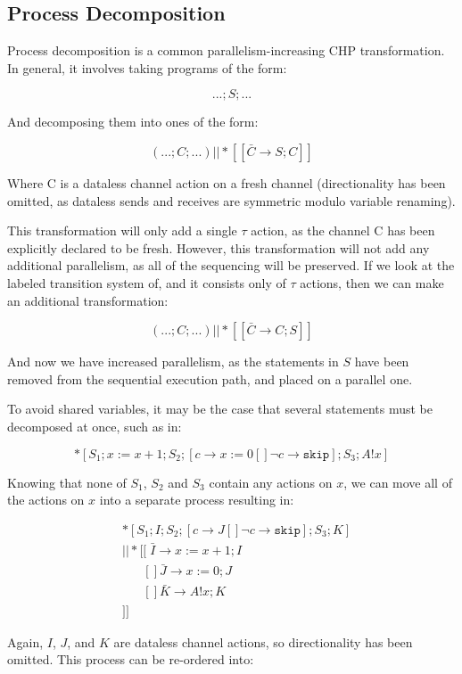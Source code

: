 \documentclass[times, 10pt]{article}
\begin{document}
\subsection{Process Decomposition}

Process decomposition is a common parallelism-increasing CHP transformation.  In
general, it involves taking programs of the form:

\[
...;S;...
\]

And decomposing them into ones of the form:

\[
(...;C;...) || *[[\bar{C} \rightarrow S; C]]
\]

Where C is a dataless channel action on a fresh channel (directionality has been
omitted, as dataless sends and receives are symmetric modulo variable renaming).

This transformation will only add a single $\tau$ action, as the channel C has
been explicitly declared to be fresh.  However, this transformation will not add
any additional parallelism, as all of the sequencing will be preserved. If we
look at the labeled transition system of, and it consists only of $\tau$
actions, then we can make an additional transformation:

\[
(...;C;...) || *[[\bar{C} \rightarrow C; S]]
\]

And now we have increased parallelism, as the statements in $S$ have been
removed from the sequential execution path, and placed on a parallel one.

To avoid shared variables, it may be the case that several statements must be decomposed at once, such as in:

\[
*[S_1; x := x + 1; S_2; [ c \rightarrow x := 0 [] \lnot c \rightarrow \texttt{skip} ]; S_3; A!x ] 
\]

Knowing that none of $S_1$, $S_2$ and $S_3$ contain any actions on $x$, we can move all of the actions on $x$ into a separate process resulting in:

\begin{align*}
& *[S_1; I; S_2; [ c \rightarrow J [] \lnot c \rightarrow \texttt{skip} ]; S_3; K] \\
& || *[[\;\bar{I} \rightarrow x := x + 1; I \\
&\;\;\;\;\;\;[] \bar{J} \rightarrow x := 0; J \\
&\;\;\;\;\;\;[] \bar{K} \rightarrow  A!x; K \\
&]]
\end{align*}

Again, $I$, $J$, and $K$ are dataless channel actions, so directionality has been omitted. This process can be re-ordered into:
\end{document}
